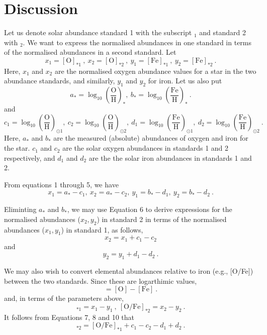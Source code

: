 \section{Discussion}
Let us denote solar abundance standard 1 with the subscript $_1$ and standard 2 with $_2$. We want to express the normalised abundances in one standard in terms of the normalised abundances in a second standard. Let
\begin{equation}
x_1 = [\text{O}]_{*1}\ ,\  x_2 = [\text{O}]_{*2}\ ,\  y_1 = [\text{Fe}]_{*1}\ ,\  y_2 = [\text{Fe}]_{*2}\ .
\end{equation}
Here, $x_1$ and $x_2$ are the normalised oxygen abundance values for a star in the two abundance standards, and similarly, $y_1$ and $y_2$ for iron.
Let us also put
\begin{equation}
a_* = \log_{10}\left(\frac{\text{O}}{\text{H}}\right)_* ,\  b_* =  \log_{10}\left(\frac{\text{Fe}}{\text{H}}\right)_*\ .
\end{equation}
and
\begin{equation}
c_1 = \log_{10}\left(\frac{\text{O}}{\text{H}}\right)_{\odot 1} ,\  c_2 =  \log_{10}\left(\frac{\text{O}}{\text{H}}\right)_{\odot 2} ,\  d_1 = \log_{10}\left(\frac{\text{Fe}}{\text{H}}\right)_{\odot 1} ,\  d_2 =  \log_{10}\left(\frac{\text{Fe}}{\text{H}}\right)_{\odot 2}\ .
\end{equation}
Here, $a_*$ and $b_*$ are the measured (absolute) abundances of oxygen and iron for the star. $c_1$ and $c_2$ are the solar oxygen abundances in standards 1 and 2 respectively, and $d_1$ and $d_2$ are the the solar iron abundances in standards 1 and 2.
  
From equations 1 through 5, we have
\begin{equation}
x_1 = a_* - c_1 ,\  x_2 = a_* - c_2 ,\ y_1 = b_* - d_1 ,\ y_2 = b_* - d_2 \ .
\end{equation}

Eliminting $a_*$ and $b_*$, we may use Equation 6 to derive expressions for the normalised abundances ($x_2, y_2$) in standard 2 in terms of the normalised abundances ($x_1, y_1$)  in standard 1, as follows,
\begin{equation}
x_2 = x_1 + c_1 - c_2 
\end{equation}
and
\begin{equation}
y_2 = y_1 + d_1 - d_2 \ .
\end{equation}

We may also wish to convert elemental abundances relative to iron (e.g., [O/Fe]) between the two standards. Since these are logarthimic values,
\begin{equation}
[\text{O}/\text{Fe}] = [\text{O}] - [\text{Fe}] \ .
\end{equation}
and, in terms of the parameters above,
\begin{equation}
[\text{O}/\text{Fe}]_{*1} = x_1 - y_1 \ ,\  [\text{O}/\text{Fe}]_{*2} = x_2 - y_2 \ .
\end{equation}
It follows from Equations 7, 8 and 10 that
\begin{equation}
[\text{O}/\text{Fe}]_{*2} = [\text{O}/\text{Fe}]_{*1} + c_1 - c_2 - d_1 +d_2 \ .
\end{equation}

